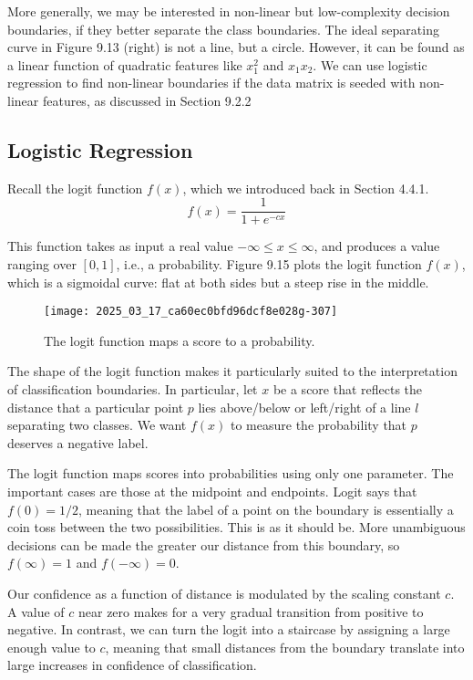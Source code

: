 \documentclass[10pt]{article}
\begin{document}
More generally, we may be interested in non-linear but low-complexity decision boundaries, if they better separate the class boundaries. The ideal separating curve in Figure 9.13 (right) is not a line, but a circle. However, it can be found as a linear function of quadratic features like \(x_{1}^{2}\) and \(x_{1} x_{2}\). We can use logistic regression to find non-linear boundaries if the data matrix is seeded with non-linear features, as discussed in Section 9.2.2

\subsection{Logistic Regression}
Recall the logit function \(f(x)\), which we introduced back in Section 4.4.1.
\[
f(x)=\frac{1}{1+e^{-cx}}
\]

This function takes as input a real value \(-\infty \leq x \leq \infty\), and produces a value ranging over \([0,1]\), i.e., a probability. Figure 9.15 plots the logit function \(f(x)\), which is a sigmoidal curve: flat at both sides but a steep rise in the middle.

\begin{figure}[h]
    \centering
    \texttt{[image: 2025\_03\_17\_ca60ec0bfd96dcf8e028g-307]}
    \caption{The logit function maps a score to a probability.}
\end{figure}

The shape of the logit function makes it particularly suited to the interpretation of classification boundaries. In particular, let \(x\) be a score that reflects the distance that a particular point \(p\) lies above/below or left/right of a line \(l\) separating two classes. We want \(f(x)\) to measure the probability that \(p\) deserves a negative label.

The logit function maps scores into probabilities using only one parameter. The important cases are those at the midpoint and endpoints. Logit says that \(f(0)=1/2\), meaning that the label of a point on the boundary is essentially a coin toss between the two possibilities. This is as it should be. More unambiguous decisions can be made the greater our distance from this boundary, so \(f(\infty)=1\) and \(f(-\infty)=0\).

Our confidence as a function of distance is modulated by the scaling constant \(c\). A value of \(c\) near zero makes for a very gradual transition from positive to negative. In contrast, we can turn the logit into a staircase by assigning a large enough value to \(c\), meaning that small distances from the boundary translate into large increases in confidence of classification.
\end{document}
